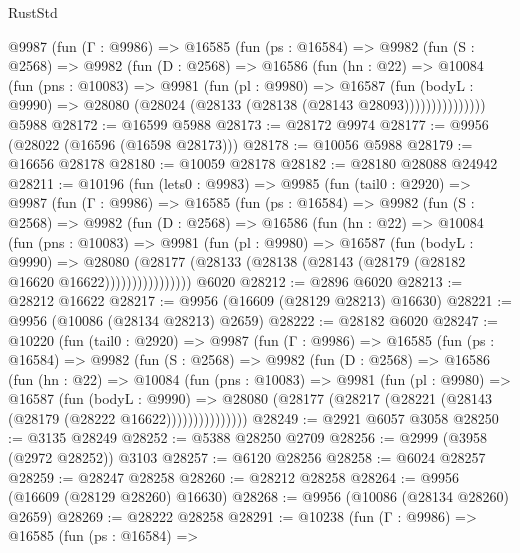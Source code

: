 \begin{lexlean}{RustStd}
\begin{coremodule}
        @9987
          (fun (Γ : @9986) =>
          @16585
            (fun (ps : @16584) =>
            @9982
              (fun (S : @2568) =>
              @9982
                (fun (D : @2568) =>
                @16586
                  (fun (hn : @22) =>
                  @10084
                    (fun (pns : @10083) =>
                    @9981
                      (fun (pl : @9980) =>
                      @16587
                        (fun (bodyL : @9990) =>
                        @28080 (@28024 (@28133 (@28138 (@28143 @28093)))))))))))))))
    @5988
@28172 := @16599 @5988
@28173 := @28172 @9974
@28177 := @9956 (@28022 (@16596 (@16598 @28173)))
@28178 := @10056 @5988
@28179 := @16656 @28178
@28180 := @10059 @28178
@28182 := @28180 @28088 @24942
@28211 := @10196
    (fun (lets0 : @9983) =>
    @9985
      (fun (tail0 : @2920) =>
      @9987
        (fun (Γ : @9986) =>
        @16585
          (fun (ps : @16584) =>
          @9982
            (fun (S : @2568) =>
            @9982
              (fun (D : @2568) =>
              @16586
                (fun (hn : @22) =>
                @10084
                  (fun (pns : @10083) =>
                  @9981
                    (fun (pl : @9980) =>
                    @16587
                      (fun (bodyL : @9990) =>
                      @28080
                        (@28177
                          (@28133 (@28138 (@28143 (@28179 (@28182 @16620 @16622))))))))))))))))
    @6020
@28212 := @2896 @6020
@28213 := @28212 @16622
@28217 := @9956 (@16609 (@28129 @28213) @16630)
@28221 := @9956 (@10086 (@28134 @28213) @2659)
@28222 := @28182 @6020
@28247 := @10220
    (fun (tail0 : @2920) =>
    @9987
      (fun (Γ : @9986) =>
      @16585
        (fun (ps : @16584) =>
        @9982
          (fun (S : @2568) =>
          @9982
            (fun (D : @2568) =>
            @16586
              (fun (hn : @22) =>
              @10084
                (fun (pns : @10083) =>
                @9981
                  (fun (pl : @9980) =>
                  @16587
                    (fun (bodyL : @9990) =>
                    @28080 (@28177 (@28217 (@28221 (@28143 (@28179 (@28222 @16622)))))))))))))))
@28249 := @2921 @6057 @3058
@28250 := @3135 @28249
@28252 := @5388 @28250 @2709
@28256 := @2999 (@3958 (@2972 @28252)) @3103
@28257 := @6120 @28256
@28258 := @6024 @28257
@28259 := @28247 @28258
@28260 := @28212 @28258
@28264 := @9956 (@16609 (@28129 @28260) @16630)
@28268 := @9956 (@10086 (@28134 @28260) @2659)
@28269 := @28222 @28258
@28291 := @10238
    (fun (Γ : @9986) =>
    @16585
      (fun (ps : @16584) =>

\end{coremodule}
\end{lexlean}
